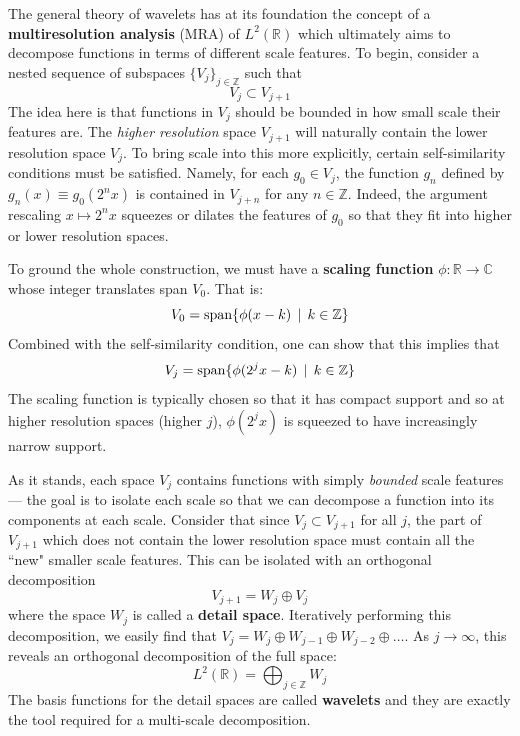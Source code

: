 \documentclass[twocolumn]{gwclass}
\newcommand{\R}{\mathbb{R}}
\newcommand{\C}{\mathbb{C}}
\newcommand{\Z}{\mathbb{Z}}
\begin{document}
The general theory of wavelets has at its foundation the concept of a \textbf{multiresolution analysis} (MRA) of $L^2(\R)$ which ultimately aims to decompose functions in terms of different scale features. To begin, consider a nested sequence of subspaces $\{V_j\}_{j\in\Z}$ such that 
$$  V_j \subset V_{j+1} $$
The idea here is that functions in $V_j$ should be bounded in how small scale their features are. The \emph{higher resolution} space $V_{j+1}$ will naturally contain the lower resolution space $V_j$. To bring scale into this more explicitly, certain self-similarity conditions must be satisfied. Namely, for each $g_0\in V_j$, the function $g_n$ defined by $g_n(x)\equiv g_0(2^n x)$ is contained in $V_{j+n}$ for any $n\in\Z$. Indeed, the argument rescaling $x\mapsto 2^n x$ squeezes or dilates the features of $g_0$ so that they fit into higher or lower resolution spaces.

To ground the whole construction, we must have a \textbf{scaling function} $\phi:\R\to\C$ whose integer translates span $V_0$. That is:
$$ V_0 = \t{span}\{\phi(x-k) \:\:|\:\:k\in\Z\} $$
Combined with the self-similarity condition, one can show that this implies that
$$ V_j = \t{span}\{ \phi(2^jx - k)\:\:|\:\: k\in \Z \} $$
The scaling function is typically chosen so that it has compact support and so at higher resolution spaces (higher $j$), $\phi(2^jx)$ is squeezed to have increasingly narrow support.

As it stands, each space $V_j$ contains functions with simply \emph{bounded} scale features --- the goal is to isolate each scale so that we can decompose a function into its components at each scale. Consider that since $V_j\subset V_{j+1}$ for all $j$, the part of $V_{j+1}$ which does not contain the lower resolution space must contain all the ``new" smaller scale features. This can be isolated with an orthogonal decomposition
$$ V_{j+1} = W_j \oplus V_j $$
where the space $W_j$ is called a \textbf{detail space}. Iteratively performing this decomposition, we easily find that $V_j=W_j\oplus W_{j-1}\oplus W_{j-2}\oplus\dots$. As $j\to\infty$, this reveals an orthogonal decomposition of the full space:
$$ L^2(\R) = \bigoplus_{j\in\Z} W_j $$
The basis functions for the detail spaces are called \textbf{wavelets} and they are exactly the tool required for a multi-scale decomposition.
\end{document}
